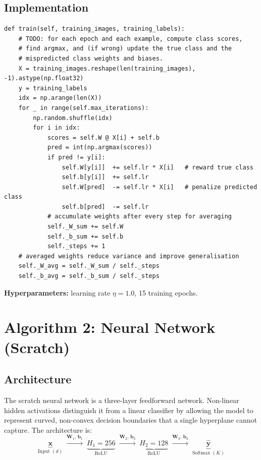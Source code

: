 \documentclass[12pt]{article}
\begin{document}
\subsection{Implementation}
\begin{lstlisting}[caption={Averaged Perceptron training loop (\texttt{q1a\_perceptron\_digits.py})}, label=lst:perc]
def train(self, training_images, training_labels):
    # TODO: for each epoch and each example, compute class scores,
    # find argmax, and (if wrong) update the true class and the
    # mispredicted class weights and biases.
    X = training_images.reshape(len(training_images), -1).astype(np.float32)
    y = training_labels
    idx = np.arange(len(X))
    for _ in range(self.max_iterations):
        np.random.shuffle(idx)
        for i in idx:
            scores = self.W @ X[i] + self.b
            pred = int(np.argmax(scores))
            if pred != y[i]:
                self.W[y[i]]  += self.lr * X[i]   # reward true class
                self.b[y[i]]  += self.lr
                self.W[pred]  -= self.lr * X[i]   # penalize predicted class
                self.b[pred]  -= self.lr
            # accumulate weights after every step for averaging
            self._W_sum += self.W
            self._b_sum += self.b
            self._steps += 1
    # averaged weights reduce variance and improve generalisation
    self._W_avg = self._W_sum / self._steps
    self._b_avg = self._b_sum / self._steps
\end{lstlisting}

\textbf{Hyperparameters:} learning rate $\eta = 1.0$, 15 training epochs.

\section{Algorithm 2: Neural Network (Scratch)}
\label{sec:scratch}

\subsection{Architecture}

The scratch neural network is a three-layer feedforward network. Non-linear hidden
activations distinguish it from a linear classifier by allowing the model to represent
curved, non-convex decision boundaries that a single hyperplane cannot capture.
The architecture is:
\[
  \underbrace{\mathbf{x}}_{\text{Input }(d)}
  \;\xrightarrow{\mathbf{W}_1,\,\mathbf{b}_1}\;
  \underbrace{H_1 = 256}_{\text{ReLU}}
  \;\xrightarrow{\mathbf{W}_2,\,\mathbf{b}_2}\;
  \underbrace{H_2 = 128}_{\text{ReLU}}
  \;\xrightarrow{\mathbf{W}_3,\,\mathbf{b}_3}\;
  \underbrace{\hat{\mathbf{y}}}_{\text{Softmax }(K)}
\]
\end{document}
